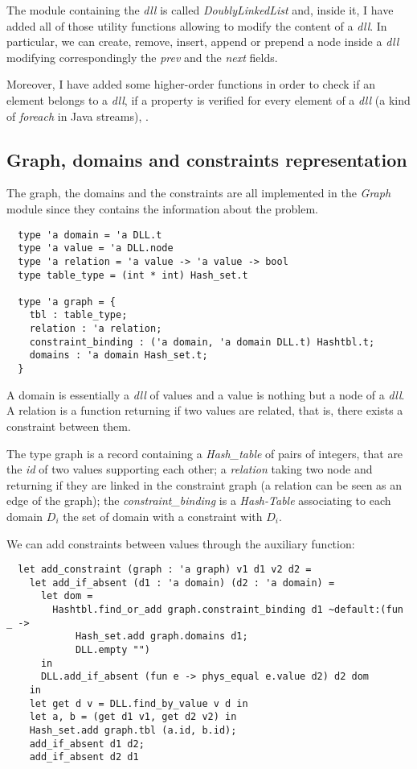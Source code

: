 \documentclass{rapport}
\begin{document}
The module containing the \textit{dll} is called \textit{DoublyLinkedList} and, inside it, I have added all of those utility functions allowing to modify the content of a \textit{dll}. In particular, we can create, remove, insert, append or prepend a node inside a \textit{dll} modifying correspondingly the \textit{prev} and the \textit{next} fields.

Moreover, I have added some higher-order functions in order to check if an element belongs to a \textit{dll}, if a property is verified for every element of a \textit{dll} (a kind of \textit{foreach} in Java streams), \etc.

\subsection{Graph, domains and constraints representation}

The graph, the domains and the constraints are all implemented in the \textit{Graph} module since they contains the information about the problem.

\begin{verbatim}
  type 'a domain = 'a DLL.t
  type 'a value = 'a DLL.node
  type 'a relation = 'a value -> 'a value -> bool
  type table_type = (int * int) Hash_set.t

  type 'a graph = {
    tbl : table_type;
    relation : 'a relation;
    constraint_binding : ('a domain, 'a domain DLL.t) Hashtbl.t;
    domains : 'a domain Hash_set.t;
  }
\end{verbatim}

A domain is essentially a \textit{dll} of values and a value is nothing but a node of a \textit{dll}. A relation is a function returning if two values are related, that is, there exists a constraint between them.

The type graph is a record containing a \textit{Hash\_table} of pairs of integers, that are the \textit{id} of two values supporting each other; a \textit{relation} taking two node and returning if they are linked in the constraint graph (a relation can be seen as an edge of the graph); the \textit{constraint\_binding} is a \textit{Hash-Table} associating to each domain $D_i$ the set of domain with a constraint with $D_i$.

We can add constraints between values through the auxiliary function:

\begin{verbatim}
  let add_constraint (graph : 'a graph) v1 d1 v2 d2 =
    let add_if_absent (d1 : 'a domain) (d2 : 'a domain) =
      let dom =
        Hashtbl.find_or_add graph.constraint_binding d1 ~default:(fun _ ->
            Hash_set.add graph.domains d1;
            DLL.empty "")
      in
      DLL.add_if_absent (fun e -> phys_equal e.value d2) d2 dom
    in
    let get d v = DLL.find_by_value v d in
    let a, b = (get d1 v1, get d2 v2) in
    Hash_set.add graph.tbl (a.id, b.id);
    add_if_absent d1 d2;
    add_if_absent d2 d1
\end{verbatim}
\end{document}
